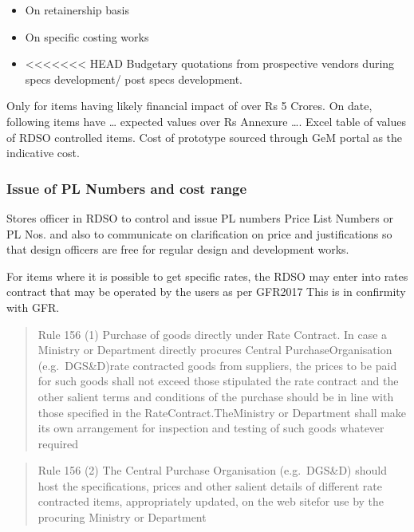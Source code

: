 \documentclass[
  11pt,
  twoside]{article}
\providecommand{\tightlist}{%
  \setlength{\itemsep}{0pt}\setlength{\parskip}{0pt}}
\begin{document}
\begin{itemize}
\tightlist
\item
  On retainership basis
\item
  On specific costing works
\item
<<<<<<< HEAD
  Budgetary quotations from prospective vendors during specs
  development/ post specs development.
\end{itemize}

Only for items having likely financial impact of over Rs 5 Crores. On
date, following items have \ldots{} expected values over Rs Annexure
\ldots. Excel table of values of RDSO controlled items. Cost of
prototype sourced through GeM portal as the indicative cost.

\hypertarget{issue-of-pl-numbers-and-cost-range}{%
\subsubsection{Issue of PL Numbers and cost
range}\label{issue-of-pl-numbers-and-cost-range}}

Stores officer in RDSO to control and issue PL numbers Price List
Numbers or PL Nos. and also to communicate on clarification on price and
justifications so that design officers are free for regular design and
development works.

For items where it is possible to get specific rates, the RDSO may enter
into rates contract that may be operated by the users as per GFR2017
This is in confirmity with GFR.

\begin{quote}
Rule 156 (1) Purchase of goods directly under Rate Contract. In case a
Ministry or Department directly procures Central PurchaseOrganisation
(e.g.~DGS\&D)rate contracted goods from suppliers, the prices to be paid
for such goods shall not exceed those stipulated the rate contract and
the other salient terms and conditions of the purchase should be in line
with those specified in the RateContract.TheMinistry or Department shall
make its own arrangement for inspection and testing of such goods
whatever required
\end{quote}

\begin{quote}
Rule 156 (2) The Central Purchase Organisation (e.g.~DGS\&D) should host
the specifications, prices and other salient details of different rate
contracted items, appropriately updated, on the web sitefor use by the
procuring Ministry or Department
\end{quote}
\end{document}

